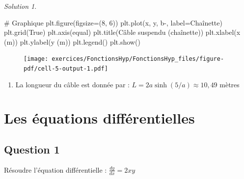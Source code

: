 \documentclass[
  12pt,
  letterpaper,
]{book}
\newenvironment{Shaded}{}{}
\newcommand{\CommentTok}[1]{\textcolor[rgb]{0.42,0.45,0.49}{#1}}
\newcommand{\DecValTok}[1]{\textcolor[rgb]{0.00,0.36,0.77}{#1}}
\newcommand{\NormalTok}[1]{\textcolor[rgb]{0.14,0.16,0.18}{#1}}
\newcommand{\OperatorTok}[1]{\textcolor[rgb]{0.14,0.16,0.18}{#1}}
\newcommand{\StringTok}[1]{\textcolor[rgb]{0.01,0.18,0.38}{#1}}
\newcommand{\VariableTok}[1]{\textcolor[rgb]{0.89,0.38,0.04}{#1}}
\providecommand{\tightlist}{%
  \setlength{\itemsep}{0pt}\setlength{\parskip}{0pt}}\usepackage{longtable,booktabs,array}
\theoremstyle{remark}
\newtheorem*{solution}{Solution}
\begin{document}
\begin{solution}
\begin{Shaded}
\begin{Highlighting}[]
\CommentTok{\# Graphique}
\NormalTok{plt.figure(figsize}\OperatorTok{=}\NormalTok{(}\DecValTok{8}\NormalTok{, }\DecValTok{6}\NormalTok{))}
\NormalTok{plt.plot(x, y, }\StringTok{\textquotesingle{}b{-}\textquotesingle{}}\NormalTok{, label}\OperatorTok{=}\StringTok{\textquotesingle{}Chaînette\textquotesingle{}}\NormalTok{)}
\NormalTok{plt.grid(}\VariableTok{True}\NormalTok{)}
\NormalTok{plt.axis(}\StringTok{\textquotesingle{}equal\textquotesingle{}}\NormalTok{)}
\NormalTok{plt.title(}\StringTok{\textquotesingle{}Câble suspendu (chaînette)\textquotesingle{}}\NormalTok{)}
\NormalTok{plt.xlabel(}\StringTok{\textquotesingle{}x (m)\textquotesingle{}}\NormalTok{)}
\NormalTok{plt.ylabel(}\StringTok{\textquotesingle{}y (m)\textquotesingle{}}\NormalTok{)}
\NormalTok{plt.legend()}
\NormalTok{plt.show()}
\end{Highlighting}
\end{Shaded}

\begin{figure}[H]

{\centering \texttt{[image: exercices/FonctionsHyp/FonctionsHyp\_files/figure-pdf/cell-5-output-1.pdf]}

}

\end{figure}

\begin{enumerate}
\def\labelenumi{\alph{enumi})}
\setcounter{enumi}{1}
\tightlist
\item
  La longueur du câble est donnée par :
  \(L = 2a \sinh(5/a) \approx 10{,}49\) mètres
\end{enumerate}

\end{solution}

\hypertarget{les-uxe9quations-diffuxe9rentielles-1}{%
\chapter{Les équations
différentielles}\label{les-uxe9quations-diffuxe9rentielles-1}}

\hypertarget{question-1-4}{%
\section{Question 1}\label{question-1-4}}

Résoudre l'équation différentielle : \(\frac{dy}{dx} = 2xy\)
\end{document}
